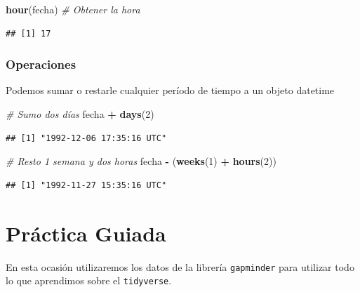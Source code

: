 \documentclass[]{book}
\newenvironment{Shaded}{\begin{snugshade}}{\end{snugshade}}
\newcommand{\CommentTok}[1]{\textcolor[rgb]{0.56,0.35,0.01}{\textit{#1}}}
\newcommand{\DecValTok}[1]{\textcolor[rgb]{0.00,0.00,0.81}{#1}}
\newcommand{\KeywordTok}[1]{\textcolor[rgb]{0.13,0.29,0.53}{\textbf{#1}}}
\newcommand{\NormalTok}[1]{#1}
\newcommand{\OperatorTok}[1]{\textcolor[rgb]{0.81,0.36,0.00}{\textbf{#1}}}
\newcommand{\StringTok}[1]{\textcolor[rgb]{0.31,0.60,0.02}{#1}}
\begin{document}
\begin{Shaded}
\begin{Highlighting}[]
\KeywordTok{hour}\NormalTok{(fecha) }\CommentTok{# Obtener la hora}
\end{Highlighting}
\end{Shaded}

\begin{verbatim}
## [1] 17
\end{verbatim}

\hypertarget{operaciones}{%
\subsubsection{Operaciones}\label{operaciones}}

Podemos sumar o restarle cualquier período de tiempo a un objeto datetime

\begin{Shaded}
\begin{Highlighting}[]
\CommentTok{# Sumo dos días }
\NormalTok{fecha }\OperatorTok{+}\StringTok{ }\KeywordTok{days}\NormalTok{(}\DecValTok{2}\NormalTok{)}
\end{Highlighting}
\end{Shaded}

\begin{verbatim}
## [1] "1992-12-06 17:35:16 UTC"
\end{verbatim}

\begin{Shaded}
\begin{Highlighting}[]
\CommentTok{# Resto 1 semana y dos horas}
\NormalTok{fecha }\OperatorTok{-}\StringTok{ }\NormalTok{(}\KeywordTok{weeks}\NormalTok{(}\DecValTok{1}\NormalTok{) }\OperatorTok{+}\StringTok{ }\KeywordTok{hours}\NormalTok{(}\DecValTok{2}\NormalTok{))}
\end{Highlighting}
\end{Shaded}

\begin{verbatim}
## [1] "1992-11-27 15:35:16 UTC"
\end{verbatim}

\hypertarget{practica-guiada-1}{%
\section{Práctica Guiada}\label{practica-guiada-1}}

En esta ocasión utilizaremos los datos de la librería \texttt{gapminder} para utilizar todo lo que aprendimos sobre el \texttt{tidyverse}.
\end{document}
